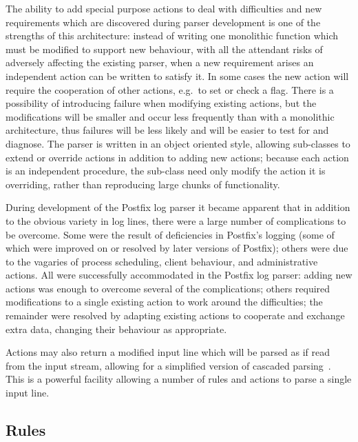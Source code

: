 \documentclass{svmult}
\begin{document}
The ability to add special purpose actions to deal with difficulties and
new requirements which are discovered during parser development is one of
the strengths of this architecture: instead of writing one monolithic
function which must be modified to support new behaviour, with all the
attendant risks of adversely affecting the existing parser, when a new
requirement arises an independent action can be written to satisfy it.  In
some cases the new action will require the cooperation of other actions,
e.g.\ to set or check a flag.  There is a possibility of introducing
failure when modifying existing actions, but the modifications will be
smaller and occur less frequently than with a monolithic architecture, thus
failures will be less likely and will be easier to test for and diagnose.
The parser is written in an object oriented style, allowing sub-classes to
extend or override actions in addition to adding new actions; because each
action is an independent procedure, the sub-class need only modify the
action it is overriding, rather than reproducing large chunks of
functionality.

During development of the Postfix log parser it became apparent that in
addition to the obvious variety in log lines, there were a large number of
complications to be overcome.  Some were the result of deficiencies in
Postfix's logging (some of which were improved on or resolved by later
versions of Postfix); others were due to the vagaries of process
scheduling, client behaviour, and administrative actions.  All were
successfully accommodated in the Postfix log parser: adding new actions was
enough to overcome several of the complications; others required
modifications to a single existing action to work around the difficulties;
the remainder were resolved by adapting existing actions to cooperate and
exchange extra data, changing their behaviour as appropriate.

Actions may also return a modified input line which will be parsed as if
read from the input stream, allowing for a simplified version of cascaded
parsing~\cite{cascaded-parsing}.  This is a powerful facility allowing a
number of rules and actions to parse a single input line.

\subsection{Rules}

\label{Rules}
\end{document}
